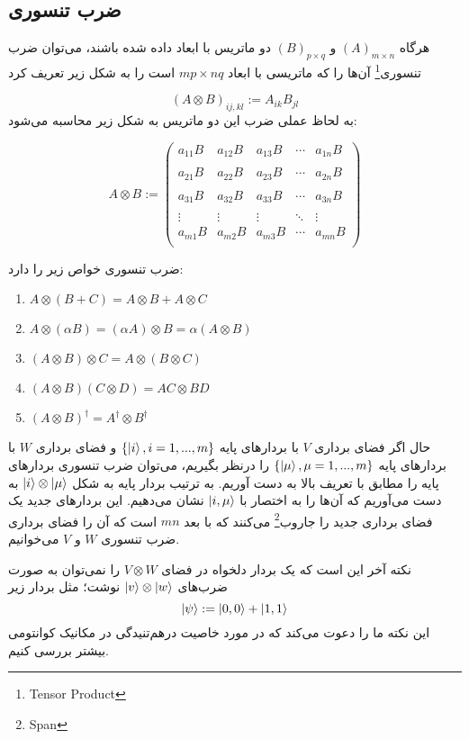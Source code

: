 \subsection{ضرب تنسوری}
 هرگاه $(A)_{m \times n}$ و $(B)_{p \times q}$ دو ماتریس با ابعاد داده شده باشند، می‌توان ضرب تنسوری‌\footnote{Tensor Product} آن‌ها را که ماتریسی با ابعاد $mp \times nq$ است را به شکل زیر تعریف کرد
 
 \begin{equation}
 	(A \otimes B)_{ij,kl} := A_{ik}B_{jl}
 \end{equation}
 به لحاظ عملی ضرب این دو ماتریس به شکل زیر محاسبه می‌شود:
 
\begin{equation}
 A \otimes B := \begin{pmatrix}
 		a_{11}B & a_{12}B & a_{13}B & \cdots & a_{1n}B \\ 
 		\\
 		a_{21}B & a_{22}B & a_{23}B & \cdots & a_{2n}B \\ 
 		\\
 		a_{31}B & a_{32}B & a_{33}B & \cdots & a_{3n}B \\ 
 		\\
 		\vdots & \vdots & \vdots & \ddots & \vdots
		\\
 		a_{m1}B & a_{m2}B & a_{m3}B & \cdots & a_{mn}B \\ 

 	\end{pmatrix}
 \end{equation} 

 	
 	ضرب تنسوری خواص زیر را دارد:
 	
 	\begin{enumerate}
 		\item $A \otimes (B + C) = A \otimes B + A \otimes C$
 		\item $A \otimes (\alpha B) = (\alpha A) \otimes B = \alpha (A \otimes B)$
 		\item $(A \otimes B) \otimes C = A \otimes ( B \otimes C)$
 		\item $(A \otimes B)(C \otimes D) = AC \otimes BD$
 		\item $(A \otimes B)^{\dagger} = A^{\dagger} \otimes B^{\dagger}$
 	\end{enumerate}
 	حال اگر فضای برداری $V$  با بردارهای پایه  $\{\ket{i}, i = 1, ..., m\}$ و فضای برداری $W$ با بردارهای پایه $\{\ket{\mu}, \mu = 1, ..., m\}$ را درنظر بگیریم، می‌توان ضرب تنسوری بردارهای پایه را مطابق با تعریف بالا به دست آوریم. به ترتیب بردار پایه به شکل $\ket{i} \otimes \ket{\mu}$ به دست می‌آوریم که آن‌ها را به اختصار با $\ket{i,\mu}$ نشان می‌دهیم. این بردارهای جدید یک فضای برداری جدید را جاروب\footnote{Span} می‌کنند که با بعد $mn$ است که آن را فضای برداری ضرب تنسوری $W$ و $V$ می‌خوانیم. 
 	

نکته آخر این است که یک بردار دلخواه در فضای $V \otimes W$ را نمی‌توان به صورت ضرب‌های $\ket{v} \otimes \ket{w}$ نوشت؛ مثل بردار زیر
\begin{equation}
	\ket{\psi} := \ket{0,0} + \ket{1,1}
\end{equation}
	این نکته ما را دعوت می‌کند که در مورد خاصیت در‌هم‌تنیدگی در مکانیک کوانتومی بیشتر بررسی کنیم. 

